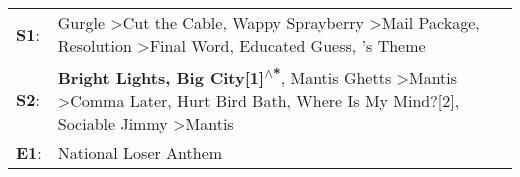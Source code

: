 \begin{supertabular}{p{0.03\textwidth}p{0.92\textwidth}}
 \textbf{S1}:  &                                       Gurgle\textsuperscript{} \textgreater \enspace Cut the Cable\textsuperscript{}, \enspace Wappy Sprayberry\textsuperscript{} \textgreater \enspace Mail Package\textsuperscript{}, \enspace Resolution\textsuperscript{} \textgreater \enspace Final Word\textsuperscript{}, \enspace Educated Guess\textsuperscript{}, 's Theme\textsuperscript{}  \enspace  \\
 \textbf{S2}:  &  \textbf{Bright Lights, Big City[1]\textsuperscript{$\wedge$*}}, \enspace Mantis Ghetts\textsuperscript{} \textgreater \enspace Mantis\textsuperscript{} \textgreater \enspace Comma Later\textsuperscript{}, \enspace Hurt Bird Bath\textsuperscript{}, \enspace Where Is My Mind?[2]\textsuperscript{}, \enspace Sociable Jimmy\textsuperscript{} \textgreater \enspace Mantis\textsuperscript{}  \enspace  \\
 \textbf{E1}:  &                                                                                                                                                                                                                                                                                                                                                            National Loser Anthem\textsuperscript{}  \enspace  \\
\end{supertabular}
